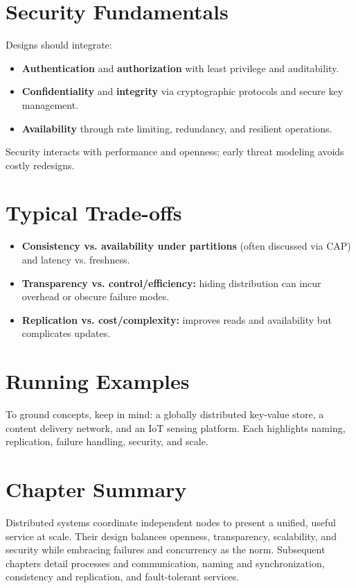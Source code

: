 \section{Security Fundamentals}
Designs should integrate:
\begin{itemize}
  \item \textbf{Authentication} and \textbf{authorization} with least privilege and auditability.
  \item \textbf{Confidentiality} and \textbf{integrity} via cryptographic protocols and secure key management.
  \item \textbf{Availability} through rate limiting, redundancy, and resilient operations.
\end{itemize}
Security interacts with performance and openness; early threat modeling avoids costly redesigns.

\section{Typical Trade-offs}
\begin{itemize}
  \item \textbf{Consistency vs. availability under partitions} (often discussed via CAP) and latency vs. freshness.
  \item \textbf{Transparency vs. control/efficiency:} hiding distribution can incur overhead or obscure failure modes.
  \item \textbf{Replication vs. cost/complexity:} improves reads and availability but complicates updates.
\end{itemize}

\section{Running Examples}
To ground concepts, keep in mind: a globally distributed key-value store, a content delivery network, and an IoT sensing platform. Each highlights naming, replication, failure handling, security, and scale.

\section{Chapter Summary}
Distributed systems coordinate independent nodes to present a unified, useful service at scale. Their design balances openness, transparency, scalability, and security while embracing failures and concurrency as the norm. Subsequent chapters detail processes and communication, naming and synchronization, consistency and replication, and fault-tolerant services.

